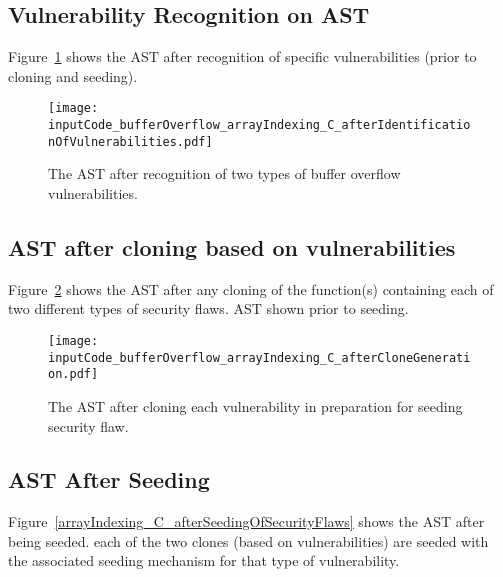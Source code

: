 \subsection{Vulnerability Recognition on AST}

Figure~\ref{arrayIndexing_C_afterIdentificationOfVulnerabilities} shows the AST after
recognition of specific vulnerabilities (prior to cloning and seeding).

\begin{figure}[h!]
\hspace{-0.35in}
\texttt{[image: inputCode\_bufferOverflow\_arrayIndexing\_C\_afterIdentificationOfVulnerabilities.pdf]}
\caption{The AST after recognition of two types of buffer overflow vulnerabilities.}
\label {arrayIndexing_C_afterIdentificationOfVulnerabilities}
\end{figure}

\subsection{AST after cloning based on vulnerabilities}

Figure~\ref{arrayIndexing_C_afterCloneGeneration} shows the AST after any cloning of
the function(s) containing each of two different types of security flaws.  AST
shown prior to seeding.

\begin{figure}[h!]
\hspace{-0.35in}
\texttt{[image: inputCode\_bufferOverflow\_arrayIndexing\_C\_afterCloneGeneration.pdf]}
\caption{The AST after cloning each vulnerability in preparation for seeding security flaw.}
\label {arrayIndexing_C_afterCloneGeneration}
\end{figure}


\subsection{AST After Seeding}

Figure~\ref{arrayIndexing_C_afterSeedingOfSecurityFlaws} shows the AST after being seeded.
each of the two clones (based on vulnerabilities) are seeded with the associated seeding
mechanism for that type of vulnerability.

